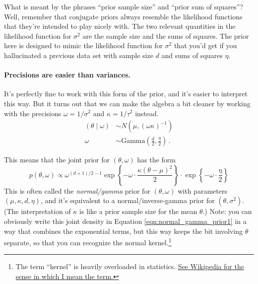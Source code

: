 \documentclass{mynotes}
\begin{document}
What is meant by the phrases ``prior sample size'' and ``prior sum of squares''?  Well, remember that conjugate priors always resemble the likelihood functions that they're intended to play nicely with.  The two relevant quantities in the likelihood function for $\sigma^2$ are the sample size and the sums of squares.  The prior here is designed to mimic the likelihood function for $\sigma^2$ that you'd get if you hallucinated a previous data set with sample size $d$ and sums of squares $\eta$.

\paragraph{Precisions are easier than variances.}  It's perfectly fine to work with this form of the prior, and it's easier to interpret this way.  But it turns out that we can make the algebra a bit cleaner by working with the precisions $\omega = 1/\sigma^2$ and $\kappa = 1/\tau^2$ instead.
\begin{align*}
(\theta \mid \omega) &\sim N(\mu, (\omega \kappa)^{-1}) \\
\omega &\sim \mbox{Gamma}\left( \frac{d}{2}, \frac{ \eta}{2} \right) \, .
\end{align*}

This means that the joint prior for $(\theta, \omega)$ has the form
\begin{equation}
\label{eqn:normal_gamma_prior1}
p(\theta, \omega) \propto \omega^{(d+1)/{2} - 1} \exp \left\{ - \omega \cdot \frac{\kappa (\theta - \mu)^2}{2}  \right\}
\cdot \exp\left\{ -  \omega \cdot \frac{\eta}{2}  \right\} 
\end{equation}
This is often called the \textit{normal/gamma} prior for $(\theta, \omega)$ with parameters $(\mu, \kappa, d, \eta)$, and it's equivalent to a normal/inverse-gamma prior for $(\theta, \sigma^2)$.  (The interpretation of $\kappa$ is like a prior sample size for the mean $\theta$.)  Note: you can obviously write this joint density in Equation \ref{eqn:normal_gamma_prior1} in a way that combines the exponential terms, but this way keeps the bit involving $\theta$ separate, so that you can recognize the normal kernel.\footnote{The term ``kernel'' is heavily overloaded in statistics. \href{http://en.wikipedia.org/wiki/Kernel_(statistics)\#In_Bayesian_statistics}{See Wikipedia for the sense in which I mean the term.}  }
\end{document}
